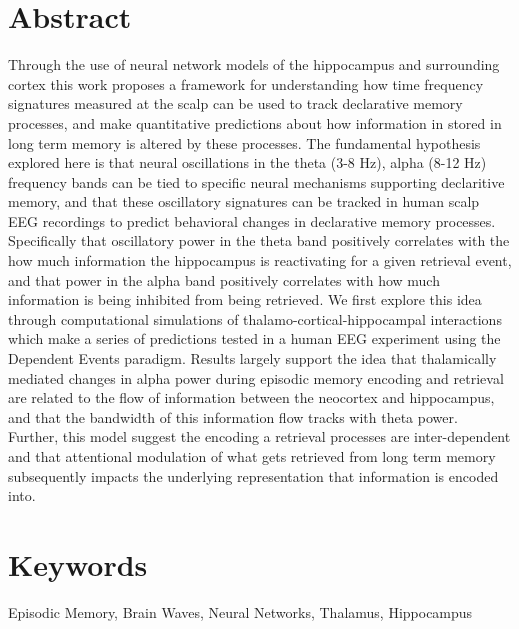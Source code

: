\documentclass[11pt, titlepage, twoside]{article}
\begin{document}
\section*{Abstract}\label{sec:abstract}
Through the use of neural network models of the hippocampus and surrounding cortex this work proposes a framework for understanding how time frequency signatures measured at the scalp can be used to track declarative memory processes, and make quantitative predictions about how information in stored in long term memory is altered by these processes.  The fundamental hypothesis explored here is that neural oscillations in the theta (3-8 Hz), alpha (8-12 Hz) frequency bands can be tied to specific neural mechanisms supporting declaritive memory, and that these oscillatory signatures can be tracked in human scalp EEG recordings to predict behavioral changes in declarative memory processes. Specifically that oscillatory power in the theta band positively correlates with the how much information the hippocampus is reactivating for a given retrieval event, and that power in the alpha band positively correlates with how much information is being inhibited from being retrieved.  We first explore this idea through computational simulations of thalamo-cortical-hippocampal interactions which make a series of predictions tested in a human EEG experiment using the Dependent Events paradigm.  Results largely support the idea that thalamically mediated changes in alpha power during episodic memory encoding and retrieval are related to the flow of information between the neocortex and hippocampus, and that the bandwidth of this information flow tracks with theta power.  Further, this model suggest the encoding a retrieval processes are inter-dependent and that attentional modulation of what gets retrieved from long term memory subsequently impacts the underlying representation that information is encoded into. 


\section*{Keywords}
Episodic Memory, Brain Waves, Neural Networks, Thalamus, Hippocampus
\end{document}
